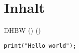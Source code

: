 \section{Inhalt}

\ac{DHBW} (\cite{BookKey}) (\cite{OnlineKey}) 

\begin{lstlisting}
print("Hello world");
\end{lstlisting}
